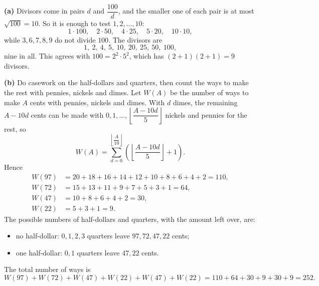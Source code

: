\textbf{(a)} Divisors come in pairs $d$ and $\dfrac{100}{d}$, and the smaller one of each pair is at most $\sqrt{100}=10$. So it is enough to test $1,2,\dots,10$:
\[1\cdot100,\quad2\cdot50,\quad4\cdot25,\quad5\cdot20,\quad10\cdot10,\]
while $3,6,7,8,9$ do not divide $100$. The divisors are
\[\boxed{1,\ 2,\ 4,\ 5,\ 10,\ 20,\ 25,\ 50,\ 100},\]
nine in all. This agrees with $100=2^2\cdot5^2$, which has $(2+1)(2+1)=9$ divisors.

\textbf{(b)} Do casework on the half-dollars and quarters, then count the ways to make the rest with pennies, nickels and dimes. Let $W(A)$ be the number of ways to make $A$ cents with pennies, nickels and dimes. With $d$ dimes, the remaining $A-10d$ cents can be made with $0,1,\dots,\left\lfloor\dfrac{A-10d}{5}\right\rfloor$ nickels and pennies for the rest, so
\[W(A)=\sum_{d=0}^{\left\lfloor\dfrac{A}{10}\right\rfloor}\left(\left\lfloor\dfrac{A-10d}{5}\right\rfloor+1\right).\]
Hence
\begin{align*}
W(97)&=20+18+16+14+12+10+8+6+4+2=110,\\
W(72)&=15+13+11+9+7+5+3+1=64,\\
W(47)&=10+8+6+4+2=30,\\
W(22)&=5+3+1=9.
\end{align*}
The possible numbers of half-dollars and quarters, with the amount left over, are:
\begin{itemize}
\item no half-dollar: $0,1,2,3$ quarters leave $97,72,47,22$ cents;
\item one half-dollar: $0,1$ quarters leave $47,22$ cents.
\end{itemize}
The total number of ways is
\[W(97)+W(72)+W(47)+W(22)+W(47)+W(22)=110+64+30+9+30+9=\boxed{252}.\]
